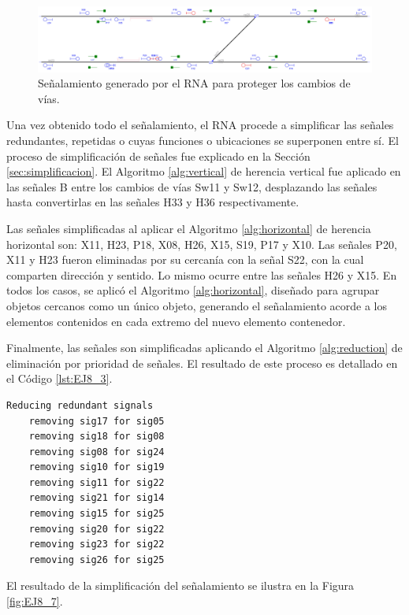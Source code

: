 	\begin{figure}[H]
		\centering
		\includegraphics[width=1\textwidth]{resultados-obtenidos/ejemplo8/images/8_step4.png}
		\centering\caption{Señalamiento generado por el RNA para proteger los cambios de vías.}
		\label{fig:EJ8_6}
	\end{figure}
	
	Una vez obtenido todo el señalamiento, el RNA procede a simplificar las señales redundantes, repetidas o cuyas funciones o ubicaciones se superponen entre sí. El proceso de simplificación de señales fue explicado en la Sección \ref{sec:simplificacion}. El Algoritmo \ref{alg:vertical} de herencia vertical fue aplicado en las señales B entre los cambios de vías Sw11 y Sw12, desplazando las señales hasta convertirlas en las señales H33 y H36 respectivamente.
	
	Las señales simplificadas al aplicar el Algoritmo \ref{alg:horizontal} de herencia horizontal son: X11, H23, P18, X08, H26, X15, S19, P17 y X10. Las señales P20, X11 y H23 fueron eliminadas por su cercanía con la señal S22, con la cual comparten dirección y sentido. Lo mismo ocurre entre las señales H26 y X15. En todos los casos, se aplicó el Algoritmo \ref{alg:horizontal}, diseñado para agrupar objetos cercanos como un único objeto, generando el señalamiento acorde a los elementos contenidos en cada extremo del nuevo elemento contenedor.
	
	Finalmente, las señales son simplificadas aplicando el Algoritmo \ref{alg:reduction} de eliminación por prioridad de señales. El resultado de este proceso es detallado en el Código \ref{lst:EJ8_3}.
	
	\begin{lstlisting}[language = {}, caption = Reducción de señalamiento por prioridad de señales, label = {lst:EJ8_3}]
	Reducing redundant signals
	removing sig17 for sig05
	removing sig18 for sig08
	removing sig08 for sig24
	removing sig10 for sig19
	removing sig11 for sig22
	removing sig21 for sig14
	removing sig15 for sig25
	removing sig20 for sig22
	removing sig23 for sig22
	removing sig26 for sig25
	\end{lstlisting}
	
	El resultado de la simplificación del señalamiento se ilustra en la Figura \ref{fig:EJ8_7}.
	
